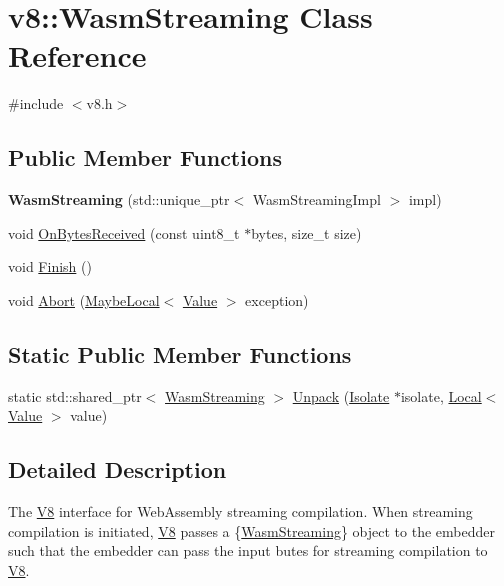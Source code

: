 \hypertarget{classv8_1_1WasmStreaming}{}\section{v8\+:\+:Wasm\+Streaming Class Reference}
\label{classv8_1_1WasmStreaming}


{\ttfamily \#include $<$v8.\+h$>$}

\subsection*{Public Member Functions}
\begin{DoxyCompactItemize}
\item 
\mbox{\label{classv8_1_1WasmStreaming_a40fe20bbbe84a244ebd306da4b8ce256}} 
{\bfseries Wasm\+Streaming} (std\+::unique\+\_\+ptr$<$ Wasm\+Streaming\+Impl $>$ impl)
\item 
void \mbox{\hyperlink{classv8_1_1WasmStreaming_ada886a06f191ac65897763bda60c2f54}{On\+Bytes\+Received}} (const uint8\+\_\+t $\ast$bytes, size\+\_\+t size)
\item 
void \mbox{\hyperlink{classv8_1_1WasmStreaming_a2c40c85c34643af871577ea98d792de6}{Finish}} ()
\item 
void \mbox{\hyperlink{classv8_1_1WasmStreaming_aca7399d97368360079e3030b2fb4fc94}{Abort}} (\mbox{\hyperlink{classv8_1_1MaybeLocal}{Maybe\+Local}}$<$ \mbox{\hyperlink{classv8_1_1Value}{Value}} $>$ exception)
\end{DoxyCompactItemize}
\subsection*{Static Public Member Functions}
\begin{DoxyCompactItemize}
\item 
static std\+::shared\+\_\+ptr$<$ \mbox{\hyperlink{classv8_1_1WasmStreaming}{Wasm\+Streaming}} $>$ \mbox{\hyperlink{classv8_1_1WasmStreaming_a343acdb301ae8c21b49c177ac28f2b07}{Unpack}} (\mbox{\hyperlink{classv8_1_1Isolate}{Isolate}} $\ast$isolate, \mbox{\hyperlink{classv8_1_1Local}{Local}}$<$ \mbox{\hyperlink{classv8_1_1Value}{Value}} $>$ value)
\end{DoxyCompactItemize}


\subsection{Detailed Description}
The \mbox{\hyperlink{classv8_1_1V8}{V8}} interface for Web\+Assembly streaming compilation. When streaming compilation is initiated, \mbox{\hyperlink{classv8_1_1V8}{V8}} passes a \{\mbox{\hyperlink{classv8_1_1WasmStreaming}{Wasm\+Streaming}}\} object to the embedder such that the embedder can pass the input butes for streaming compilation to \mbox{\hyperlink{classv8_1_1V8}{V8}}. 

